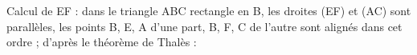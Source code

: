 
\medskip

%
% 
% 
% 
%

Calcul de EF : dans le triangle ABC rectangle en B, les droites (EF) et (AC) sont parallèles, les points B, E, A d'une part, B, F, C de l'autre sont alignés dans cet ordre ; d'après le théorème de Thalès :

